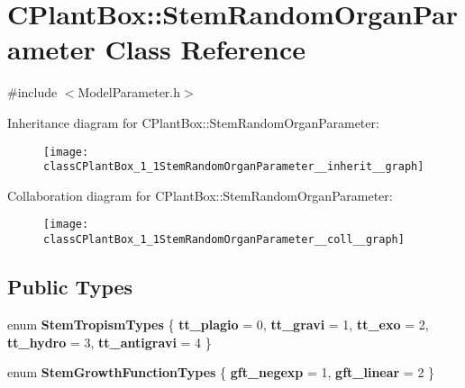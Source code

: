 \hypertarget{classCPlantBox_1_1StemRandomOrganParameter}{}\section{C\+Plant\+Box\+:\+:Stem\+Random\+Organ\+Parameter Class Reference}
\label{classCPlantBox_1_1StemRandomOrganParameter}


{\ttfamily \#include $<$Model\+Parameter.\+h$>$}



Inheritance diagram for C\+Plant\+Box\+:\+:Stem\+Random\+Organ\+Parameter\+:\nopagebreak
\begin{figure}[H]
\begin{center}
\leavevmode
\texttt{[image: classCPlantBox\_1\_1StemRandomOrganParameter\_\_inherit\_\_graph]}
\end{center}
\end{figure}


Collaboration diagram for C\+Plant\+Box\+:\+:Stem\+Random\+Organ\+Parameter\+:\nopagebreak
\begin{figure}[H]
\begin{center}
\leavevmode
\texttt{[image: classCPlantBox\_1\_1StemRandomOrganParameter\_\_coll\_\_graph]}
\end{center}
\end{figure}
\subsection*{Public Types}
\begin{DoxyCompactItemize}
\item 
\mbox{\label{classCPlantBox_1_1StemRandomOrganParameter_aca082570c57598c9c63c2aecadb82358}} 
enum {\bfseries Stem\+Tropism\+Types} \{ \newline
{\bfseries tt\+\_\+plagio} = 0, 
{\bfseries tt\+\_\+gravi} = 1, 
{\bfseries tt\+\_\+exo} = 2, 
{\bfseries tt\+\_\+hydro} = 3, 
\newline
{\bfseries tt\+\_\+antigravi} = 4
 \}
\item 
\mbox{\label{classCPlantBox_1_1StemRandomOrganParameter_ac3a2e93ca97a3f2482e837edfe3d8121}} 
enum {\bfseries Stem\+Growth\+Function\+Types} \{ {\bfseries gft\+\_\+negexp} = 1, 
{\bfseries gft\+\_\+linear} = 2
 \}
\end{DoxyCompactItemize}
